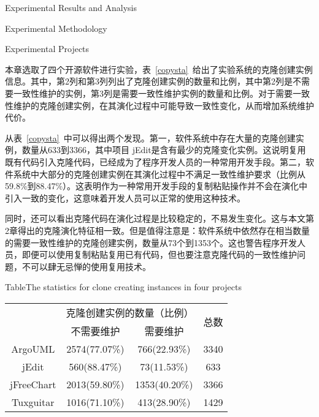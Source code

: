 {Experimental Results and Analysis}

{Experimental Methodology}

{Experimental Projects}

本章选取了四个开源软件进行实验，表~\ref{copysta}~给出了实验系统的克隆创建实例信息。其中，第2列和第3列列出了克隆创建实例的数量和比例，其中第2列是不需要一致性维护的实例，第3列是需要一致性维护实例的数量和比例。对于需要一致性维护的克隆创建实例，在其演化过程中可能导致一致性变化，从而增加系统维护代价。

从表~\ref{copysta}~中可以得出两个发现。第一，软件系统中存在大量的克隆创建实例，数量从633到3366，其中项目 jEdit是含有最少的克隆变化实例。这说明复用既有代码引入克隆代码，已经成为了程序开发人员的一种常用开发手段。第二，软件系统中大部分的克隆创建实例在其演化过程中不满足一致性维护要求（比例从59.8\%到88.47\%）。这表明作为一种常用开发手段的复制粘贴操作并不会在演化中引入一致的变化，这意味着开发人员可以正常的使用这种技术。

同时，还可以看出克隆代码在演化过程是比较稳定的，不易发生变化。这与本文第2章得出的克隆演化特征相一致。但是值得注意是：软件系统中依然存在相当数量的需要一致性维护的克隆创建实例，数量从73个到1353个。这也警告程序开发人员，即便可以使用复制粘贴复用已有代码，但也要注意克隆代码的一致性维护问题，不可以肆无忌惮的使用复用技术。

\begin{table}[htbp]
{Table$\!$}{The statistics for clone creating instances in four projects}
\vspace{0.5em}
\centering
\wuhao
\begin{tabular}{cccc}
\toprule[1.5pt]
~\multirow{2}{*}{实验系统}& \multicolumn{2}{c}{克隆创建实例的数量（比例）} & \multirow{2}{*}{总数}\\ 
 \cline{2-3}
~&{不需要维护} &{需要维护} & ~\\
\midrule[1pt]
ArgoUML&	2574(77.07\%)&	766(22.93\%)&	3340\\
jEdit&	560(88.47\%)&	73(11.53\%)&	633\\
jFreeChart&	2013(59.80\%)&	1353(40.20\%)&	3366\\
Tuxguitar&	1016(71.10\%)&	413(28.90\%)&	1429\\
\bottomrule[1.5pt]
\end{tabular}
\end{table}


